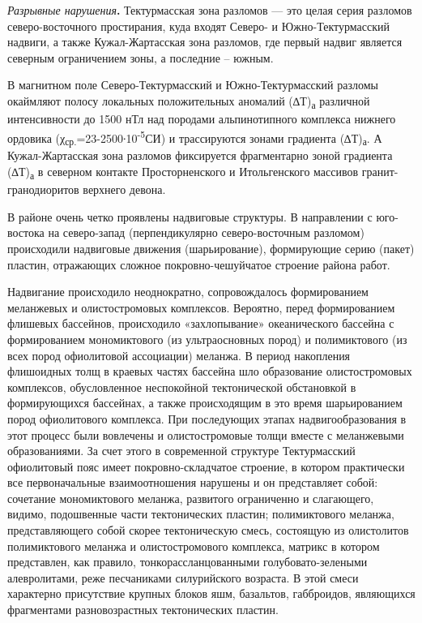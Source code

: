 \emph{Разрывные нарушения}{\bfseries .} Тектурмасская зона разломов --- это
целая серия разломов северо-восточного простирания, куда входят Северо-
и Южно-Тектурмасский надвиги, а также Кужал-Жартасская зона разломов,
где первый надвиг является северным ограничением зоны, а последние --
южным.

В магнитном поле Северо-Тектурмасский и Южно-Тектурмасский разломы
окаймляют полосу локальных положительных аномалий (∆Т)\textsubscript{а}
различной интенсивности до 1500 нТл над породами альпинотипного
комплекса нижнего ордовика
(χ\textsubscript{ср.}=23-2500∙10\textsuperscript{-5}СИ) и трассируются
зонами градиента (∆Т)\textsubscript{а}. А Кужал-Жартасская зона разломов
фиксируется фрагментарно зоной градиента (∆Т)\textsubscript{а} в
северном контакте Просторненского и Итольгенского массивов
гранит-гранодиоритов верхнего девона.

В районе очень четко проявлены надвиговые структуры. В направлении с
юго-востока на северо-запад (перпендикулярно северо-восточным разломом)
происходили надвиговые движения (шарьирование), формирующие серию
(пакет) пластин, отражающих сложное покровно-чешуйчатое строение района
работ.

Надвигание происходило неоднократно, сопровождалось формированием
меланжевых и олистостромовых комплексов. Вероятно, перед формированием
флишевых бассейнов, происходило «захлопывание» океанического бассейна с
формированием мономиктового (из ультраосновных пород) и полимиктового
(из всех пород офиолитовой ассоциации) меланжа. В период накопления
флишоидных толщ в краевых частях бассейна шло образование
олистостромовых комплексов, обусловленное неспокойной тектонической
обстановкой в формирующихся бассейнах, а также происходящим в это время
шарьированием пород офиолитового комплекса. При последующих этапах
надвигообразования в этот процесс были вовлечены и олистостромовые толщи
вместе с меланжевыми образованиями. За счет этого в современной
структуре Тектурмасский офиолитовый пояс имеет покровно-складчатое
строение, в котором практически все первоначальные взаимоотношения
нарушены и он представляет собой: сочетание мономиктового меланжа,
развитого ограниченно и слагающего, видимо, подошвенные части
тектонических пластин; полимиктового меланжа, представляющего собой
скорее тектоническую смесь, состоящую из олистолитов полимиктового
меланжа и олистостромового комплекса, матрикс в котором представлен, как
правило, тонкорассланцованными голубовато-зелеными алевролитами, реже
песчаниками силурийского возраста. В этой смеси характерно присутствие
крупных блоков яшм, базальтов, габброидов, являющихся фрагментами
разновозрастных тектонических пластин.

